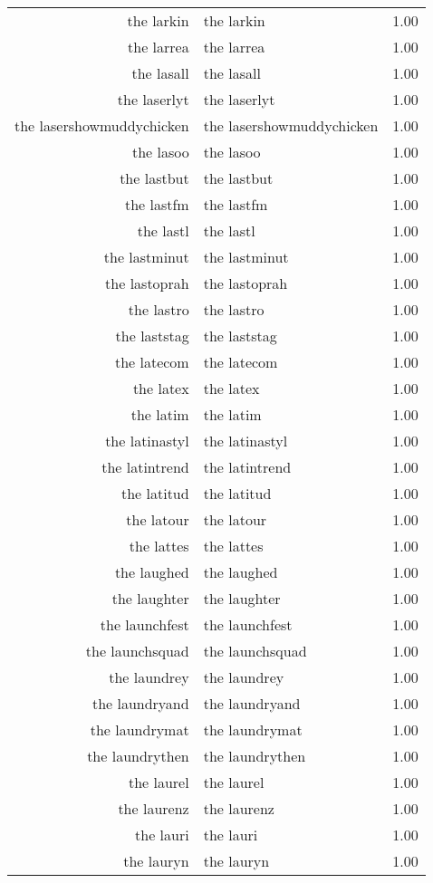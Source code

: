 \begin{table}[ht]
\begin{tabular}{rlr}
  the larkin & the larkin & 1.00 \\ 
  the larrea & the larrea & 1.00 \\ 
  the lasall & the lasall & 1.00 \\ 
  the laserlyt & the laserlyt & 1.00 \\ 
  the lasershowmuddychicken & the lasershowmuddychicken & 1.00 \\ 
  the lasoo & the lasoo & 1.00 \\ 
  the lastbut & the lastbut & 1.00 \\ 
  the lastfm & the lastfm & 1.00 \\ 
  the lastl & the lastl & 1.00 \\ 
  the lastminut & the lastminut & 1.00 \\ 
  the lastoprah & the lastoprah & 1.00 \\ 
  the lastro & the lastro & 1.00 \\ 
  the laststag & the laststag & 1.00 \\ 
  the latecom & the latecom & 1.00 \\ 
  the latex & the latex & 1.00 \\ 
  the latim & the latim & 1.00 \\ 
  the latinastyl & the latinastyl & 1.00 \\ 
  the latintrend & the latintrend & 1.00 \\ 
  the latitud & the latitud & 1.00 \\ 
  the latour & the latour & 1.00 \\ 
  the lattes & the lattes & 1.00 \\ 
  the laughed & the laughed & 1.00 \\ 
  the laughter & the laughter & 1.00 \\ 
  the launchfest & the launchfest & 1.00 \\ 
  the launchsquad & the launchsquad & 1.00 \\ 
  the laundrey & the laundrey & 1.00 \\ 
  the laundryand & the laundryand & 1.00 \\ 
  the laundrymat & the laundrymat & 1.00 \\ 
  the laundrythen & the laundrythen & 1.00 \\ 
  the laurel & the laurel & 1.00 \\ 
  the laurenz & the laurenz & 1.00 \\ 
  the lauri & the lauri & 1.00 \\ 
  the lauryn & the lauryn & 1.00 \\ 

\end{tabular}
\end{table}
